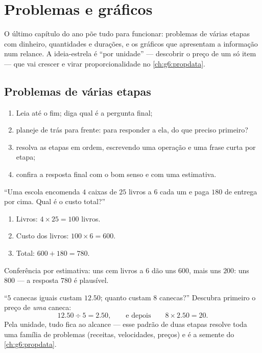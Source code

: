 \chapter{Problemas e gráficos}\label{ch:g5:data}

O último capítulo do ano põe tudo para funcionar: problemas de várias
etapas com dinheiro, quantidades e durações, e os gráficos que
apresentam a informação num relance. A ideia-estrela é ``por
unidade'' --- descobrir o preço de um só item --- que vai crescer e
virar proporcionalidade no \cref{ch:g6:propdata}.

\section{Problemas de várias etapas}

\begin{method}\label{met:g5:data:steps}
\begin{enumerate}
  \item Leia até o fim; diga qual é a pergunta final;
  \item planeje de trás para frente: para responder a ela, do que
        preciso primeiro?
  \item resolva as etapas em ordem, escrevendo uma operação e uma
        frase curta por etapa;
  \item confira a resposta final com o bom senso e com uma
        estimativa.
\end{enumerate}
\end{method}

\begin{example}\label{ex:g5:data:multistep}
``Uma escola encomenda $4$ caixas de $25$ livros a $6$ cada um e paga
$180$ de entrega por cima. Qual é o custo total?''
\begin{enumerate}
  \item Livros: $4 \times 25 = 100$ livros.
  \item Custo dos livros: $100 \times 6 = 600$.
  \item Total: $600 + 180 = 780$.
\end{enumerate}
Conferência por estimativa: uns cem livros a $6$ dão uns $600$, mais
uns $200$: uns $800$ --- a resposta $780$ é plausível.
\end{example}

\begin{example}\label{ex:g5:data:perone}
``$5$ canecas iguais custam $12.50$; quanto custam $8$ canecas?''
Descubra primeiro o preço de \emph{uma} caneca:
\[
12.50 \div 5 = 2.50,
\qquad\text{e depois}\qquad
8 \times 2.50 = 20 .
\]
Pela unidade, tudo fica ao alcance --- esse padrão de duas etapas
resolve toda uma família de problemas (receitas, velocidades,
preços) e é a semente do \cref{ch:g6:propdata}.
\end{example}

